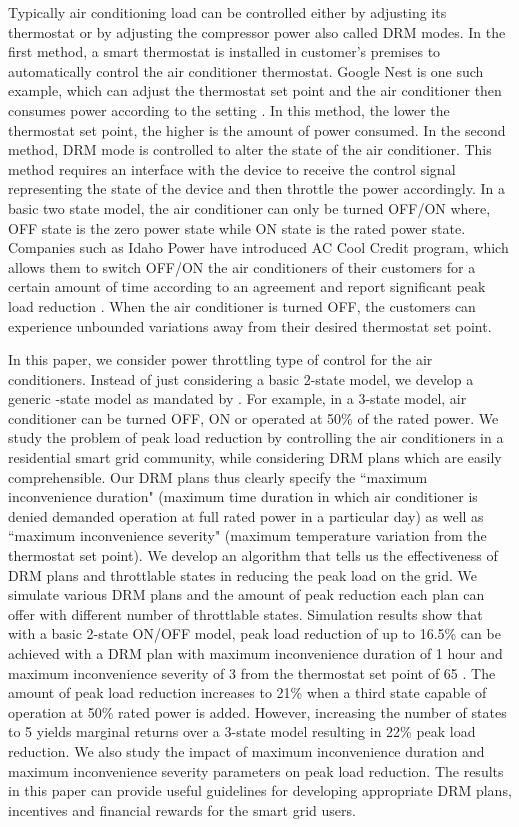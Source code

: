 \documentclass[10pt,twocolumn,twoside]{IEEEtran}
\begin{document}
Typically air conditioning load can be controlled either by adjusting its thermostat or by adjusting the compressor power also called DRM modes. In the first method, a smart thermostat is installed in customer's premises to automatically control the air conditioner thermostat. Google Nest is one such example, which can adjust the thermostat set point and the air conditioner then consumes power according to the setting \cite{googlenest}. In this method, the lower the thermostat set point, the higher is the amount of power consumed. In the second method, DRM mode is controlled to alter the state of the air conditioner. This method requires an interface with the device to receive the control signal representing the state of the device and then throttle the power accordingly. In a basic two state model, the air conditioner can only be turned OFF/ON where, OFF state is the zero power state while ON state is the rated power state. Companies such as Idaho Power have introduced AC Cool Credit program, which allows them to switch OFF/ON the air conditioners of their customers for a certain amount of time according to an agreement and report significant peak load reduction \cite{idaho}. When the air conditioner is turned OFF, the customers can experience unbounded variations away from their desired thermostat set point. 


In this paper, we consider power throttling type of control for the air conditioners. Instead of just considering a basic 2-state model, we develop a generic -state model as mandated by \cite{aus_stand}. For example, in a 3-state model, air conditioner can be turned OFF, ON or operated at 50\% of the rated power. We study the problem of peak load reduction by controlling the air conditioners in a residential smart grid community, while considering DRM plans which are easily comprehensible. Our DRM plans thus clearly specify the ``maximum inconvenience duration" (maximum time duration in which air conditioner is denied demanded operation at full rated power in a particular day) as well as ``maximum inconvenience severity" (maximum temperature variation from the thermostat set point). We develop an algorithm that tells us the effectiveness of DRM plans and throttlable states in reducing the peak load on the grid. We simulate various DRM plans and the amount of peak reduction each plan can offer with different number of throttlable states. Simulation results show that with a basic 2-state ON/OFF model, peak load reduction of up to 16.5\% can be achieved with a DRM plan with maximum inconvenience duration of 1 hour and maximum inconvenience severity of 3  from the thermostat set point of 65 . The amount of peak load reduction increases to 21\% when a third state capable of operation at 50\% rated power is added. However, increasing the number of states to 5 yields marginal returns over a 3-state model resulting in 22\% peak load reduction. We also study the impact of maximum inconvenience duration and maximum inconvenience severity parameters on peak load reduction. The results in this paper can provide useful guidelines for developing appropriate DRM plans, incentives and financial rewards for the smart grid users.
\end{document}
